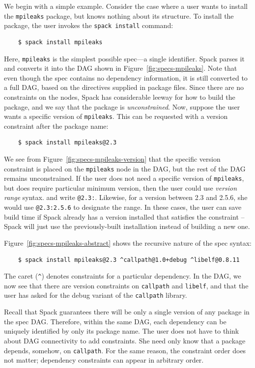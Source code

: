 We begin with a simple example.
Consider the case where a user wants to install the {\tt mpileaks} package, but knows
nothing about its structure.  To install the package, the user invokes the {\tt spack install}
command:
%
\begin{verbatim}
    $ spack install mpileaks
\end{verbatim}
%
Here, {\tt mpileaks} is the simplest possible spec---a single identifier.
Spack parses it and converts it into the DAG shown in Figure~\ref{fig:specs-mpileaks}.
Note that even though the spec contains no dependency information, it is still 
converted to a full DAG, based on the directives supplied in package files. Since there
are no constraints on the nodes, Spack has considerable leeway for how to build the package,
and we say that the package is {\it unconstrained}.
%
Now, suppose the user wants a specific version of {\tt mpileaks}.  This can be requested
with a version constraint after the package name:
%
\begin{verbatim}
    $ spack install mpileaks@2.3
\end{verbatim}
%
We see from Figure~\ref{fig:specs-mpileaks-version} that the specific version constraint is
placed on the {\tt mpileaks} node in the DAG, but the rest of the DAG remains unconstrained.
If the user does not need a specific version of {\tt mpileaks}, but does require
particular minimum version, then the user could use {\it version range} syntax.
and write {\tt @2.3:}.  Likewise, for a version between 2.3 and 2.5.6, she would use
{\tt @2.3:2.5.6} to designate the range. In these cases, the user can save build time if
Spack already has a version installed that satisfies the constraint -- Spack will just use
the previously-built installation instead of building a new one.

Figure~\ref{fig:specs-mpileaks-abstract} shows the recursive nature of the spec syntax:
%
\begin{verbatim}
    $ spack install mpileaks@2.3 ^callpath@1.0+debug ^libelf@0.8.11
\end{verbatim}
%
The caret (\verb|^|) denotes constraints for a particular dependency.  In the DAG,
we now see that there are version constraints on {\tt callpath} and {\tt libelf},
and that the user has asked for the debug variant of the {\tt callpath} library.

Recall that Spack guarantees there will be only a single version of any package in 
the spec DAG.  Therefore, within the same DAG, each dependency can be uniquely identified by 
only its package name.  The user does not have to think about DAG connectivity to add
constraints.  She need only know that a package depends, somehow, on {\tt callpath}. 
For the same reason, the constraint order does not matter; dependency constraints
can appear in arbitrary order.

